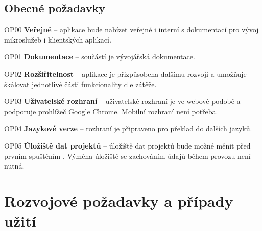 \subsection{Obecné požadavky}\label{subsec:spec-req-common}

\begin{dl}
   \item[OP00]
   \textbf{Veřejné } – aplikace bude nabízet veřejné i interní  s dokumentací pro vývoj mikroslužeb i klientských aplikací.

   \item[OP01]
   \textbf{Dokumentace} – součástí  je vývojářská dokumentace.

   \item[OP02]
   \textbf{Rozšiřitelnost} – aplikace je přizpůsobena dalšímu rozvoji a umožňuje škálovat jednotlivé části funkcionality dle zátěže.

   \item[OP03]
   \textbf{Uživatelské rozhraní} – uživatelské rozhraní je ve webové podobě a podporuje prohlížeč Google Chrome.
   Mobilní rozhraní není potřeba.

   \item[OP04]
   \textbf{Jazykové verze} – rozhraní je připraveno pro překlad do dalších jazyků.

   \item[OP05]
   \textbf{Úložiště dat projektů} – úložiště dat projektů bude možné měnit před prvním spuštěním .
   Výměna úložiště se zachováním údajů během provozu  není nutná.
\end{dl}


\clearpage



\section{Rozvojové požadavky a případy užití}\label{sec:optional-spec}


